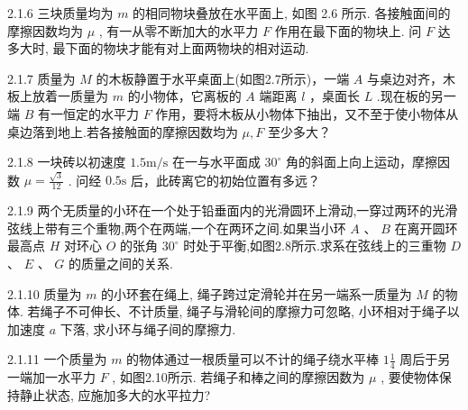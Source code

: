 \begin{problem}{2.1.6}
三块质量均为 $m$ 的相同物块叠放在水平面上, 如图 2.6 所示. 各接触面间的摩擦因数均为 $\mu$ , 有一从零不断加大的水平力 $F$ 作用在最下面的物块上. 问 $F$ 达多大时, 最下面的物块才能有对上面两物块的相对运动.
\begin{center}

\end{center}
\end{problem}
\clearpage


\begin{problem}{2.1.7}
质量为 $M$ 的木板静置于水平桌面上(如图2.7所示)，一端 $A$ 与桌边对齐，木板上放着一质量为 $m$ 的小物体，它离板的 $A$ 端距离 $l$ ，桌面长 $L$ .现在板的另一端 $B$ 有一恒定的水平力 $F$ 作用，要将木板从小物体下抽出，又不至于使小物体从桌边落到地上.若各接触面的摩擦因数均为 $\mu ,F$ 至少多大？
\begin{center}

\end{center}
\end{problem}
\clearpage


\begin{problem}{2.1.8}
一块砖以初速度 $1.5\mathrm{m / s}$ 在一与水平面成 $30^{\circ}$ 角的斜面上向上运动，摩擦因数 $\mu = \frac{\sqrt{3}}{12}$ . 问经 $0.5\mathrm{s}$ 后，此砖离它的初始位置有多远？
\end{problem}
\clearpage


\begin{problem}{2.1.9}
两个无质量的小环在一个处于铅垂面内的光滑圆环上滑动,一穿过两环的光滑弦线上带有三个重物,两个在两端,一个在两环之间.如果当小环 $A$ 、 $B$ 在离开圆环最高点 $H$ 对环心 $O$ 的张角 $30^{\circ}$ 时处于平衡,如图2.8所示.求系在弦线上的三重物 $D$ 、 $E$ 、 $G$ 的质量之间的关系.
\begin{center}

\end{center}
\end{problem}
\clearpage


\begin{problem}{2.1.10}
质量为 $m$ 的小环套在绳上, 绳子跨过定滑轮并在另一端系一质量为 $M$ 的物体. 若绳子不可伸长、不计质量, 绳子与滑轮间的摩擦力可忽略, 小环相对于绳子以加速度 $a$ 下落, 求小环与绳子间的摩擦力.
\begin{center}

\end{center}
\end{problem}
\clearpage


\begin{problem}{2.1.11}
一个质量为 $m$ 的物体通过一根质量可以不计的绳子绕水平棒 $1\frac{1}{4}$ 周后于另一端加一水平力 $F$ , 如图2.10所示. 若绳子和棒之间的摩擦因数为 $\mu$ , 要使物体保持静止状态, 应施加多大的水平拉力?
\begin{center}

\end{center}
\end{problem}
\clearpage



